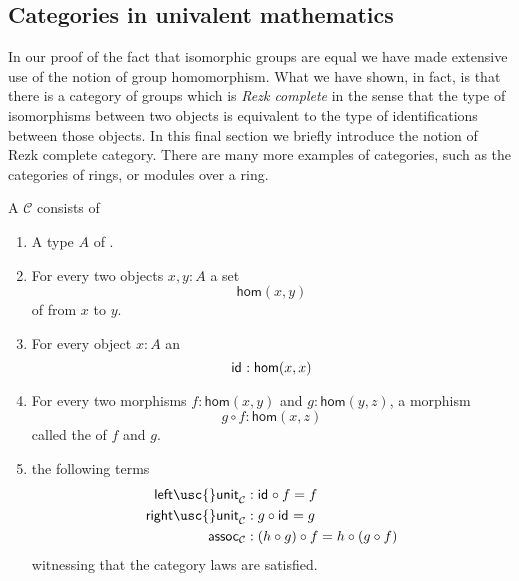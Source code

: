 \subsection{Categories in univalent mathematics}

In our proof of the fact that isomorphic groups are equal we have made extensive use of the notion of group homomorphism. What we have shown, in fact, is that there is a category of groups which is \emph{Rezk complete} in the sense that the type of isomorphisms between two objects is equivalent to the type of identifications between those objects. In this final section we briefly introduce the notion of Rezk complete category. There are many more examples of categories, such as the categories of rings, or modules over a ring.

\begin{defn}
  A  $\mathcal{C}$ consists of
  \begin{enumerate}
  \item A type $A$ of .
  \item For every two objects $x,y:A$ a set
    \begin{equation*}
      \mathsf{hom}(x,y)
    \end{equation*}
    of  from $x$ to $y$.
  \item For every object $x:A$ an 
    \begin{equation*}
      \mathsf{id}_{} : \mathsf{hom}(x,x)
    \end{equation*}
  \item For every two morphisms $f:\mathsf{hom}(x,y)$ and $g:\mathsf{hom}(y,z)$, a morphism
    \begin{equation*}
      g\circ f :\mathsf{hom}(x,z)
    \end{equation*}
    called the  of $f$ and $g$.
  \item the following terms
    \begin{align*}
      \mathsf{left\usc{}unit}_{\mathcal{C}} & : \idfunc \circ f = f \\
      \mathsf{right\usc{}unit}_{\mathcal{C}} & : g \circ \idfunc = g \\
      \mathsf{assoc}_{\mathcal{C}} & : (h \circ g) \circ f = h \circ (g \circ f)
    \end{align*}
    witnessing that the category laws are satisfied.
  \end{enumerate}
\end{defn}

